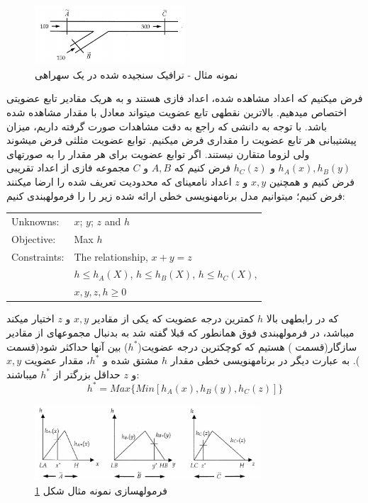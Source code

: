 \documentclass[10pt,a4paper]{article}
\newcommand{\نیمفاصله}{\halfspace}
\renewcommand{\ }{\halfspace}
\newcommand{\؛}{،}
\begin{document}
\begin{figure}[H]
    \centering
    \includegraphics[width=0.5\textwidth]{traffic}
    \caption{نمونه مثال - ترافیک سنجیده شده در یک سه\ راهی}
    \label{fig:نمونه-مثال}
\end{figure}
فرض می\ کنیم که اعداد مشاهده شده، اعداد فازی هستند و به هریک مقادیر تابع عضویتی اختصاص می\ دهیم. بالاترین نقطه\ ی تابع عضویت می\ تواند معادل با مقدار مشاهده شده باشد. با توجه به دانشی که راجع به دقت مشاهدات صورت گرفته داریم، میزان پیشتیبانی هر تابع عضویت را مقداری فرض می\ کنیم.
توابع عضویت مثلثی فرض می\ شوند ولی لزوما متقارن نیستند. اگر توابع عضویت برای هر مقدار را به صورت\ های
$h_A(x), h_B(y)$ و $h_C(z)$
فرض کنیم که
$A, B$ و $C$
مجموعه فازی از اعداد تقریبی فرض کنیم و همچنین
$x, y$ و $z$
اعداد نامعین\ ای که محدودیت تعریف شده را ارضا می\ کنند فرض کنیم؛ می\ توانیم مدل برنامه\ نویسی خطی ارائه شده زیر را را فرموله\ بندی کنیم:
\begin{latin}
\begin{table}[H]
    \begin{tabular}{ l l }
        Unknowns:       & $x$; $y$; $z$ and $h$\\
        Objective:      & Max $h$\\
        Constraints:    & The relationship, $x + y = z$\\
                        & $h \leq h_A(X)$, $h \leq h_B(X)$, $h \leq h_C(X)$,\\
                        & $x, y, z, h \geq 0$\\
    \end{tabular}  
\end{table}
\end{latin}
که در رابطه\ ی بالا $h$ کمترین درجه عضویت که یکی از مقادیر
$x, y$ و $z$
اختیار می\ کند می\ باشد، در فرموله\ بندی فوق همانطور که قبلا گفته شد به بدنبال مجموعه\ ای از مقادیر سازگار(قسمت ) هستیم که کوچکترین درجه عضویت($h^*$) بین آنها حداکثر شود(قسمت ). به عبارت دیگر در برنامه\ نویسی خطی مقدار $h$ مشتق شده و $h^*$\؛ مقدار عضویت
$x, y$ و $z$
حداقل بزرگتر از $h^*$ می\ باشند:
\[h^* = Max\{Min[h_A(x), h_B(y), h_C(z)]\}\]
\begin{figure}[H]
    \centering
    \includegraphics[width=0.75\textwidth]{prob-formul}
    \caption{فرموله\ سازی نمونه مثال شکل 
    \ref{fig:نمونه-مثال}}
    \label{fig:فرموله-سازی-نمونه-مثال}
\end{figure}
\end{document}
